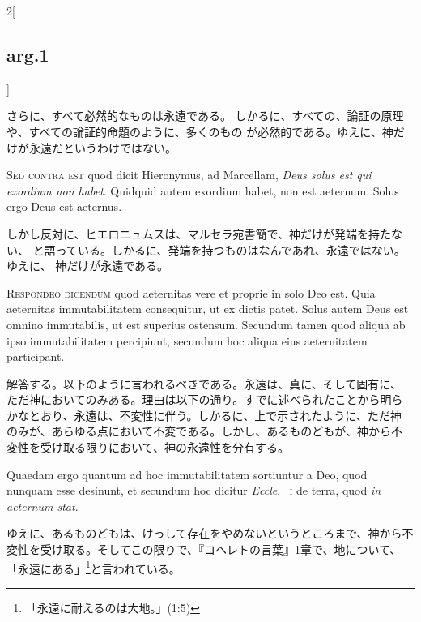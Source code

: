 \documentclass[paper=a4paper,fontsize=10pt,jafontsize=9pt,titlepage]{jlreq}
\begin{document}
\begin{paracol}{2}[\subsection{arg.1}]
\switchcolumn

さらに、すべて必然的なものは永遠である。
しかるに、すべての、論証の原理や、すべての論証的命題のように、多くのもの
が必然的である。ゆえに、神だけが永遠だというわけではない。

\switchcolumn*[\subsection{s.c.}]

{\scshape Sed contra est} quod dicit Hieronymus, ad Marcellam, {\itshape
Deus solus est qui exordium non habet}. Quidquid autem exordium habet,
non est aeternum. Solus ergo Deus est aeternus.

\switchcolumn

しかし反対に、ヒエロニュムスは、マルセラ宛書簡で、神だけが発端を持たない、
と語っている。しかるに、発端を持つものはなんであれ、永遠ではない。ゆえに、
神だけが永遠である。


{\scshape Respondeo dicendum} quod aeternitas vere et proprie in solo Deo est. Quia
aeternitas immutabilitatem consequitur, ut ex dictis patet. Solus autem
Deus est omnino immutabilis, ut est superius ostensum. 
Secundum tamen quod aliqua ab ipso immutabilitatem percipiunt, secundum
hoc aliqua eius aeternitatem participant.

\switchcolumn

解答する。以下のように言われるべきである。永遠は、真に、そして固有に、
ただ神においてのみある。理由は以下の通り。すでに述べられたことから明ら
かなとおり、永遠は、不変性に伴う。しかるに、上で示されたように、ただ神
のみが、あらゆる点において不変である。しかし、あるものどもが、神から不
変性を受け取る限りにおいて、神の永遠性を分有する。

\switchcolumn*

Quaedam ergo quantum ad hoc immutabilitatem sortiuntur a Deo, quod
nunquam esse desinunt, et secundum hoc dicitur {\itshape Eccle}.~{\scshape
i} de terra, quod {\itshape in aeternum stat}.

\switchcolumn

ゆえに、あるものどもは、けっして存在をやめないというところまで、神から不
変性を受け取る。そしてこの限りで、『コヘレトの言葉』1章で、地について、
「永遠にある」\footnote{「永遠に耐えるのは大地。」(1:5)}と言われている。


\end{paracol}
\end{document}
